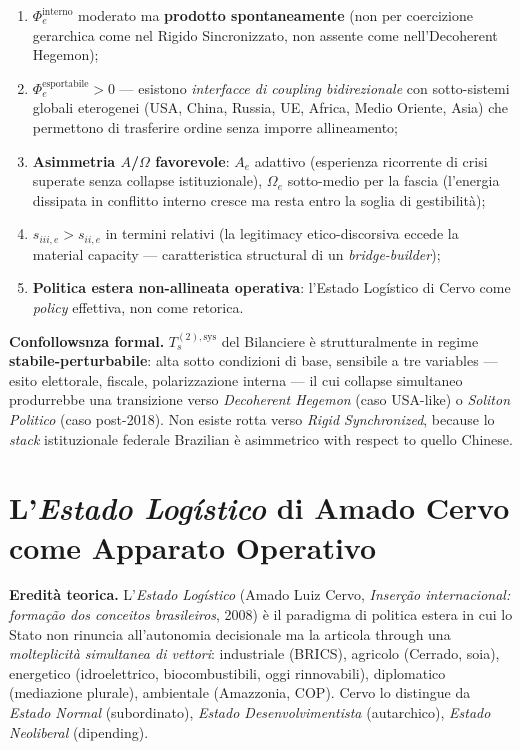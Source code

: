 \begin{enumerate}
\def\labelenumi{\arabic{enumi}.}
\tightlist
\item
  \(\Phi_e^{\text{interno}}\) moderato ma \textbf{prodotto
  spontaneamente} (non per coercizione gerarchica come nel Rigido
  Sincronizzato, non assente come nell'Decoherent Hegemon);
\item
  \(\Phi_e^{\text{esportabile}} > 0\) --- esistono \emph{interfacce di
  coupling bidirezionale} con sotto-sistemi globali eterogenei
  (USA, China, Russia, UE, Africa, Medio Oriente, Asia) che permettono di
  trasferire ordine senza imporre allineamento;
\item
  \textbf{Asimmetria \(A\)/\(\Omega\) favorevole}: \(A_e\) adattivo
  (esperienza ricorrente di crisi superate senza collapse
  istituzionale), \(\Omega_e\) sotto-medio per la fascia (l'energia
  dissipata in conflitto interno cresce ma resta entro la soglia di
  gestibilità);
\item
  \(s_{iii,e} > s_{ii,e}\) in termini relativi (la legitimacy
  etico-discorsiva eccede la material capacity --- caratteristica
  structural di un \emph{bridge-builder});
\item
  \textbf{Politica estera non-allineata operativa}: l'Estado Logístico
  di Cervo come \emph{policy} effettiva, non come retorica.
\end{enumerate}

\Proved{} \textbf{Confollowsnza formal.} \(T_s^{(2),\text{sys}}\) del
Bilanciere è strutturalmente in regime \textbf{stabile-perturbabile}:
alta sotto condizioni di base, sensibile a tre variables --- esito
elettorale, fiscale, polarizzazione interna --- il cui collapse
simultaneo produrrebbe una transizione verso \emph{Decoherent Hegemon}
(caso USA-like) o \emph{Soliton Politico} (caso post-2018). Non esiste
rotta verso \emph{Rigid Synchronized}, because lo \emph{stack}
istituzionale federale Brazilian è asimmetrico with respect to quello
Chinese.



\section{\texorpdfstring{L'\emph{Estado Logístico} di Amado Cervo come
Apparato
Operativo}{L'Estado Logístico di Amado Cervo come Apparato Operativo}}\label{lestado-loguxedstico-di-amado-cervo-come-apparato-operational}

\Hypoth{} \textbf{Eredità teorica.} L'\emph{Estado Logístico} (Amado
Luiz Cervo, \emph{Inserção internacional: formação dos conceitos
brasileiros}, 2008) è il paradigma di politica estera in cui lo Stato
non rinuncia all'autonomia decisionale ma la articola through una
\emph{molteplicità simultanea di vettori}: industriale (BRICS), agricolo
(Cerrado, soia), energetico (idroelettrico, biocombustibili, oggi
rinnovabili), diplomatico (mediazione plurale), ambientale (Amazzonia,
COP). Cervo lo distingue da \emph{Estado Normal} (subordinato),
\emph{Estado Desenvolvimentista} (autarchico), \emph{Estado Neoliberal}
(dipending).

